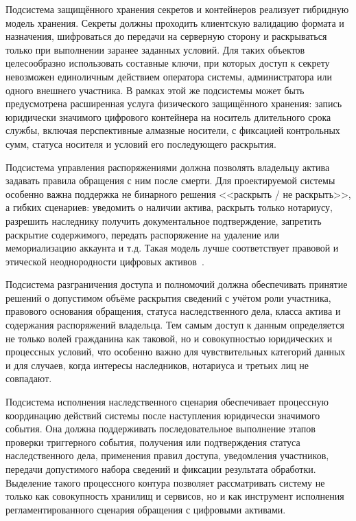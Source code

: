 Подсистема защищённого хранения секретов и контейнеров реализует гибридную модель хранения. Секреты должны проходить клиентскую валидацию формата и назначения, шифроваться до передачи на серверную сторону и раскрываться только при выполнении заранее заданных условий. Для таких объектов целесообразно использовать составные ключи, при которых доступ к секрету невозможен единоличным действием оператора системы, администратора или одного внешнего участника. В рамках этой же подсистемы может быть предусмотрена расширенная услуга физического защищённого хранения: запись юридически значимого цифрового контейнера на носитель длительного срока службы, включая перспективные алмазные носители, с фиксацией контрольных сумм, статуса носителя и условий его последующего раскрытия.

Подсистема управления распоряжениями должна позволять владельцу актива задавать правила обращения с ним после смерти. Для проектируемой системы особенно важна поддержка не бинарного решения <<раскрыть / не раскрыть>>, а гибких сценариев: уведомить о наличии актива, раскрыть только нотариусу, разрешить наследнику получить документальное подтверждение, запретить раскрытие содержимого, передать распоряжение на удаление или мемориализацию аккаунта и т.д. Такая модель лучше соответствует правовой и этической неоднородности цифровых активов~\cite{Edwards2013PostMortemPrivacy, RUFADAA2015}.

Подсистема разграничения доступа и полномочий должна обеспечивать принятие решений о допустимом объёме раскрытия сведений с учётом роли участника, правового основания обращения, статуса наследственного дела, класса актива и содержания распоряжений владельца. Тем самым доступ к данным определяется не только волей гражданина как таковой, но и совокупностью юридических и процессных условий, что особенно важно для чувствительных категорий данных и для случаев, когда интересы наследников, нотариуса и третьих лиц не совпадают.

Подсистема исполнения наследственного сценария обеспечивает процессную координацию действий системы после наступления юридически значимого события. Она должна поддерживать последовательное выполнение этапов проверки триггерного события, получения или подтверждения статуса наследственного дела, применения правил доступа, уведомления участников, передачи допустимого набора сведений и фиксации результата обработки. Выделение такого процессного контура позволяет рассматривать систему не только как совокупность хранилищ и сервисов, но и как инструмент исполнения регламентированного сценария обращения с цифровыми активами.

